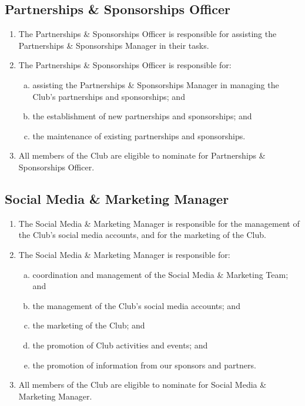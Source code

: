 \documentclass{schedule}
\begin{document}
\subsection{Partnerships \& Sponsorships Officer}
\begin{enumerate}[(1)]
    \item The Partnerships \& Sponsorships Officer is responsible for assisting the Partnerships \& Sponsorships Manager in their tasks.
    \item The Partnerships \& Sponsorships Officer is responsible for:
          \begin{enumerate}[(a)]
              \item assisting the Partnerships \& Sponsorships Manager in managing the Club's partnerships and sponsorships; and
              \item the establishment of new partnerships and sponsorships; and
              \item the maintenance of existing partnerships and sponsorships.
          \end{enumerate}
    \item All members of the Club are eligible to nominate for Partnerships \& Sponsorships Officer.
\end{enumerate}

\subsection{Social Media \& Marketing Manager}
\begin{enumerate}[(1)]
    \item The Social Media \& Marketing Manager is responsible for the management of the Club's social media accounts, and for the marketing of the Club.
    \item The Social Media \& Marketing Manager is responsible for:
          \begin{enumerate}[(a)]
              \item coordination and management of the Social Media \& Marketing Team; and
              \item the management of the Club's social media accounts; and
              \item the marketing of the Club; and
              \item the promotion of Club activities and events; and
              \item the promotion of information from our sponsors and partners.
          \end{enumerate}
    \item All members of the Club are eligible to nominate for Social Media \& Marketing Manager.
\end{enumerate}
\end{document}
